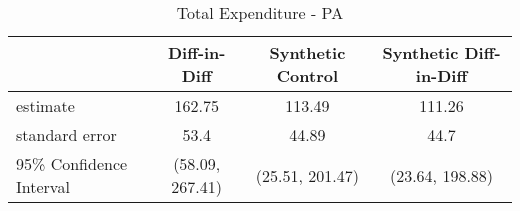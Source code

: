 \begin{table}[ht]
\centering
\begin{tabular}{lccc}
  \hline
 & Diff-in-Diff & Synthetic Control & Synthetic Diff-in-Diff \\ 
  \hline
estimate & 162.75 & 113.49 & 111.26 \\ 
  standard error & 53.4 & 44.89 & 44.7 \\ 
  95\% Confidence Interval & (58.09, 267.41) & (25.51, 201.47) & (23.64, 198.88) \\ 
   \hline
\end{tabular}
\caption{Total Expenditure - PA} 
\end{table}

